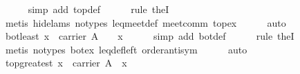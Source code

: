\begin{isabellebody}
%
\isadelimproof
\ \ \ \ %
\endisadelimproof
%
\isatagproof
{}\isamarkupfalse%
\ {}simp\ add{}\ top{}def{}\isanewline
\ \ \ \ \isamarkupfalse%
\ {}rule\ the{}I{}{}\isanewline
\ \ \ \ \isamarkupfalse%
\ {}metis\ {}hide{}lams{}\ no{}types{}\ leq{}meet{}def\ meet{}comm\ top{}ex{}\isanewline
\ \ \ \ \isamarkupfalse%
\ auto%
\endisatagproof
{\isafoldproof}%
%
\isadelimproof
\isanewline
%
\endisadelimproof
\isanewline
\ \ \isamarkupfalse%
\ bot{}least{}\ {}x\ {}\ carrier\ A\ {}\ {}\ {}\ x{}\isanewline
%
\isadelimproof
\ \ \ \ %
\endisadelimproof
%
\isatagproof
{}\isamarkupfalse%
\ {}simp\ add{}\ bot{}def{}\isanewline
\ \ \ \ \isamarkupfalse%
\ {}rule\ the{}I{}{}\isanewline
\ \ \ \ \isamarkupfalse%
\ {}metis\ {}no{}types{}\ bot{}ex\ leq{}def{}left\ order{}antisym{}\isanewline
\ \ \ \ \isamarkupfalse%
\ auto%
\endisatagproof
{\isafoldproof}%
%
\isadelimproof
\isanewline
%
\endisadelimproof
\isanewline
\ \ \isamarkupfalse%
\ top{}greatest{}\ {}x\ {}\ carrier\ A\ {}\ x\ {}\ {}{}\isanewline

\end{isabellebody}
